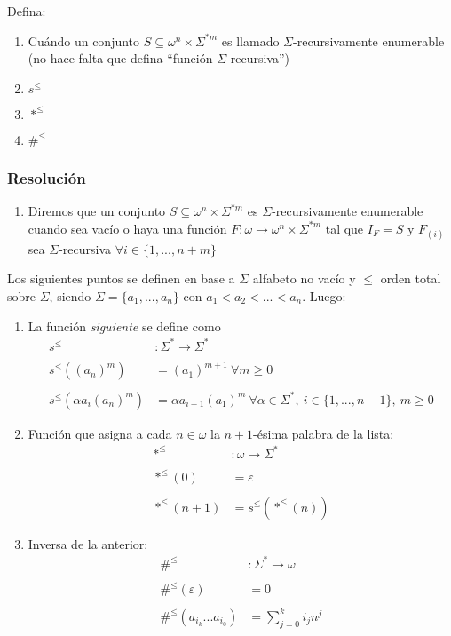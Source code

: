 \documentclass[
]{article}
\providecommand{\tightlist}{%
  \setlength{\itemsep}{0pt}\setlength{\parskip}{0pt}}
\begin{document}
Defina:

\begin{enumerate}
\def\labelenumi{\arabic{enumi}.}
\tightlist
\item
  Cuándo un conjunto \(S\subseteq\omega^n\times\Sigma^{*m}\) es llamado
  \(\Sigma\)-recursivamente enumerable (no hace falta que defina
  ``función \(\Sigma\)-recursiva'')
\item
  \(s^\leq\)
\item
  \(*^\leq\)
\item
  \(\#^\leq\)
\end{enumerate}

\subsubsection{Resolución}\label{resoluciuxf3n-2}

\begin{enumerate}
\def\labelenumi{\arabic{enumi}.}
\tightlist
\item
  Diremos que un conjunto \(S\subseteq\omega^n\times\Sigma^{*m}\) es
  \(\Sigma\)-recursivamente enumerable cuando sea vacío o haya una
  función \(F:\omega\to\omega^n\times\Sigma^{*m}\) tal que \(I_F=S\) y
  \(F_{(i)}\) sea \(\Sigma\)-recursiva \(\forall i\in\{1,...,n+m\}\)
\end{enumerate}

Los siguientes puntos se definen en base a \(\Sigma\) alfabeto no vacío
y \(\leq\) orden total sobre \(\Sigma\), siendo
\(\Sigma=\{a_1,...,a_n\}\) con \(a_1<a_2<...<a_n\). Luego:

\begin{enumerate}
\def\labelenumi{\arabic{enumi}.}
\setcounter{enumi}{1}
\tightlist
\item
  La función \emph{siguiente} se define como
  \[\begin{aligned}s^\leq&:\Sigma^*\to\Sigma^*\\ \\ s^\leq((a_n)^m)&=(a_1)^{m+1}\ \forall m\geq 0\\ \\ s^\leq(\alpha a_i(a_n)^m)&=\alpha a_{i+1} (a_1)^m\ \forall\alpha\in\Sigma^*,\ i\in\{1,...,n-1\},\ m\geq 0\end{aligned}\]
\item
  Función que asigna a cada \(n\in\omega\) la \(n+1\)-ésima palabra de
  la lista:
  \[\begin{aligned}*^\leq&:\omega\to\Sigma^*\\ \\ *^\leq(0)&=\varepsilon\\ \\ *^\leq(n+1)&=s^\leq(*^\leq(n))\end{aligned}\]
\item
  Inversa de la anterior:
  \[\begin{aligned}\#^\leq&:\Sigma^*\to\omega\\ \\ \#^\leq(\varepsilon)&=0\\ \\ \#^\leq(a_{i_k}...a_{i_0})&=\sum_{j=0}^k i_jn^j\end{aligned}\]
\end{enumerate}
\end{document}
